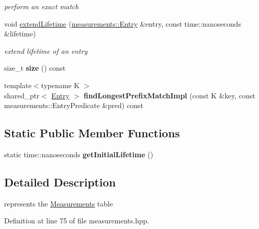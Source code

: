 \begin{DoxyCompactItemize}
\begin{DoxyCompactList}\small\item\em perform an exact match \end{DoxyCompactList}\item 
void \hyperlink{classnfd_1_1Measurements_a351d846f5320cf3ba7f23de5b4e47ae0}{extend\+Lifetime} (\hyperlink{classnfd_1_1measurements_1_1Entry}{measurements\+::\+Entry} \&entry, const time\+::nanoseconds \&lifetime)
\begin{DoxyCompactList}\small\item\em extend lifetime of an entry \end{DoxyCompactList}\item 
size\+\_\+t {\bfseries size} () const\hypertarget{classnfd_1_1Measurements_a0503bd154f4b0886b13255e9ad948427}{}\label{classnfd_1_1Measurements_a0503bd154f4b0886b13255e9ad948427}

\item 
{\footnotesize template$<$typename K $>$ }\\shared\+\_\+ptr$<$ \hyperlink{classnfd_1_1measurements_1_1Entry}{Entry} $>$ {\bfseries find\+Longest\+Prefix\+Match\+Impl} (const K \&key, const measurements\+::\+Entry\+Predicate \&pred) const\hypertarget{classnfd_1_1Measurements_a22ccf88203dc99196feeddb92be2662b}{}\label{classnfd_1_1Measurements_a22ccf88203dc99196feeddb92be2662b}

\end{DoxyCompactItemize}
\subsection*{Static Public Member Functions}
\begin{DoxyCompactItemize}
\item 
static time\+::nanoseconds {\bfseries get\+Initial\+Lifetime} ()\hypertarget{classnfd_1_1Measurements_a1f0a3e475c9a445bae78e42c603b066c}{}\label{classnfd_1_1Measurements_a1f0a3e475c9a445bae78e42c603b066c}

\end{DoxyCompactItemize}


\subsection{Detailed Description}
represents the \hyperlink{classnfd_1_1Measurements}{Measurements} table 

Definition at line 75 of file measurements.\+hpp.



